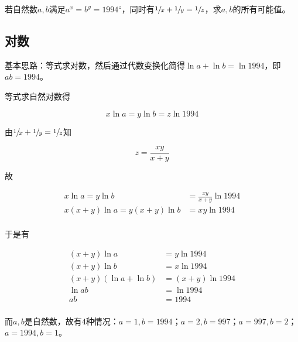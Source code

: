 

若自然数$a, b$满足$a^x = b^y = 1994^z$，同时有$\sfrac1x + \sfrac1y = \sfrac1z$，求$a, b$的所有可能值。


\subsection{对数}

基本思路：等式求对数，然后通过代数变换化简得$\ln a + \ln b = \ln 1994$，即$ab = 1994$。

等式求自然对数得

\[ x\ln a = y\ln b = z\ln1994 \]

由$\sfrac1x + \sfrac1y = \sfrac1z$知

\[ z = \frac{xy}{x + y} \]

故

\begin{align*}
  x\ln a = y\ln b &= \frac{xy}{x + y}\ln1994 \\
  x(x + y)\ln a = y(x + y)\ln b &= xy\ln1994 \\
\end{align*}

于是有

\begin{align*}
  (x + y)\ln a &= y\ln1994 \\
  (x + y)\ln b &= x\ln1994 \\
  (x + y)(\ln a + \ln b) &= (x + y)\ln1994 \\
  \ln ab &= \ln1994 \\
  ab &= 1994 \\
\end{align*}

而$a, b$是自然数，故有$4$种情况：$a = 1, b = 1994$；$a = 2, b = 997$；$a = 997, b = 2$；$a = 1994, b = 1$。
